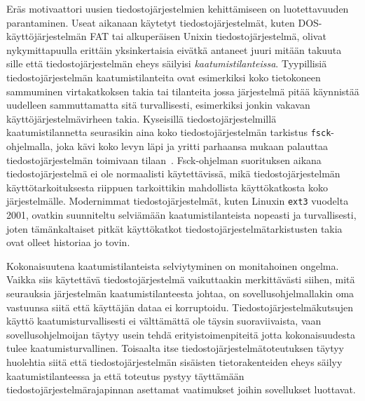 Eräs motivaattori uusien tiedostojärjestelmien kehittämiseen on luotettavuuden parantaminen.
Useat aikanaan käytetyt tiedostojärjestelmät,
kuten DOS-käyttöjärjestelmän FAT tai alkuperäisen Unixin tiedostojärjestelmä,
olivat nykymittapuulla erittäin yksinkertaisia eivätkä antaneet juuri mitään takuuta sille että tiedostojärjestelmän eheys säilyisi \emph{kaatumistilanteissa}.
Tyypillisiä tiedostojärjestelmän kaatumistilanteita ovat esimerkiksi koko tietokoneen sammuminen virtakatkoksen takia tai
tilanteita jossa järjestelmä pitää käynnistää uudelleen sammuttamatta sitä turvallisesti,
esimerkiksi jonkin vakavan käyttöjärjestelmävirheen takia.
Kyseisillä tiedostojärjestelmillä kaatumistilannetta seurasikin aina koko tiedostojärjestelmän tarkistus \texttt{fsck}-ohjelmalla,
joka kävi koko levyn läpi ja yritti parhaansa mukaan palauttaa tiedostojärjestelmän toimivaan tilaan~\cite{Ext2Journal}.
Fsck-ohjelman suorituksen aikana tiedostojärjestelmä ei ole normaalisti käytettävissä,
mikä tiedostojärjestelmän käyttötarkoituksesta riippuen tarkoittikin mahdollista käyttökatkosta koko järjestelmälle.
Modernimmat tiedostojärjestelmät, kuten Linuxin \texttt{ext3} vuodelta 2001, ovatkin suunniteltu selviämään kaatumistilanteista nopeasti ja turvallisesti,
joten tämänkaltaiset pitkät käyttökatkot tiedostojärjestelmätarkistusten takia ovat olleet historiaa jo tovin.

Kokonaisuutena kaatumistilanteista selviytyminen on monitahoinen ongelma.
Vaikka siis käytettävä tiedostojärjestelmä vaikuttaakin merkittävästi siihen,
mitä seurauksia järjestelmän kaatumistilanteesta johtaa,
on sovellusohjelmallakin oma vastuunsa siitä että käyttäjän dataa ei korruptoidu.
Tiedostojärjestelmäkutsujen käyttö kaatumisturvallisesti ei välttämättä ole täysin suoraviivaista,
vaan sovellusohjelmoijan täytyy usein tehdä erityistoimenpiteitä jotta kokonaisuudesta tulee kaatumisturvallinen.
Toisaalta itse tiedostojärjestelmätoteutuksen täytyy huolehtia siitä että tiedostojärjestelmän sisäisten tietorakenteiden eheys säilyy kaatumistilanteessa ja että toteutus pystyy täyttämään tiedostojärjestelmärajapinnan asettamat vaatimukset joihin sovellukset luottavat.

